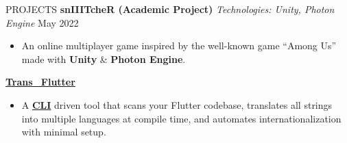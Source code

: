 \documentclass{resume}
\begin{document}
\begin{rSection}{PROJECTS}
    \textbf{snIIITcheR (Academic Project)} \textit{Technologies: Unity, Photon Engine} \hfill May 2022
    \begin{itemize}
        \itemsep -3pt {}
        \item An online multiplayer game inspired by the well-known game “Among Us” made with \textbf{Unity} \& \textbf{Photon Engine}.
    \end{itemize}

    \textbf{\href{https://pub.dev/packages/trans_flutter}{Trans\_Flutter}}
    \begin{itemize}
        \itemsep -3pt {}
        \item A \textbf{\href{https://pub.dev/packages/fluttertrans}{CLI}} driven tool that scans your Flutter codebase, translates all strings into multiple languages at compile time, and automates internationalization with minimal setup.
    \end{itemize}
\end{rSection}


\end{document}
